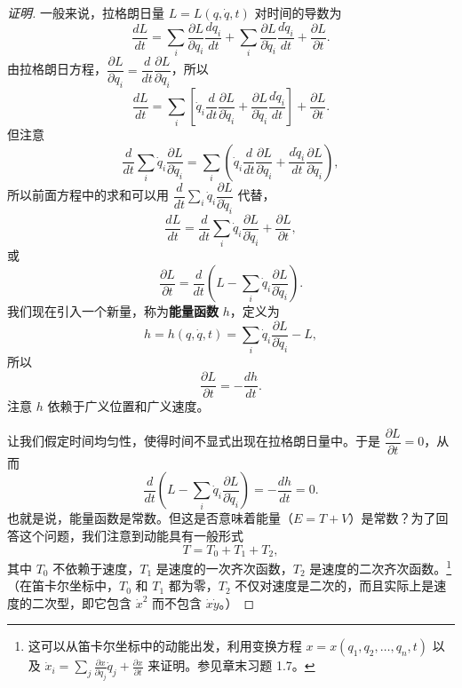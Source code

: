 \begin{proof}[证明]
一般来说，拉格朗日量 $L = L(q, \dot{q}, t)$ 对时间的导数为
\begin{equation}\label{eq:1.dLdt}
\frac{dL}{dt} = \sum_i\frac{\partial L}{\partial q_i}\frac{dq_i}{dt} + \sum_i\frac{\partial L}{\partial \dot{q}_i}\frac{d\dot{q}_i}{dt} + \frac{\partial L}{\partial t}.
\end{equation}
由拉格朗日方程，$\dfrac{\partial L}{\partial q_i} = \dfrac{d}{dt}\dfrac{\partial L}{\partial \dot{q}_i}$，所以
\begin{equation}\label{eq:1.dLdt2}
\frac{dL}{dt} = \sum_i\left[\dot{q}_i\frac{d}{dt}\frac{\partial L}{\partial \dot{q}_i} + \frac{\partial L}{\partial \dot{q}_i}\frac{d\dot{q}_i}{dt}\right] + \frac{\partial L}{\partial t}.
\end{equation}
但注意
\begin{equation}\label{eq:1.dsum}
\frac{d}{dt}\sum_i\dot{q}_i\frac{\partial L}{\partial \dot{q}_i} = \sum_i\left(\dot{q}_i\frac{d}{dt}\frac{\partial L}{\partial \dot{q}_i} + \frac{d\dot{q}_i}{dt}\frac{\partial L}{\partial \dot{q}_i}\right),
\end{equation}
所以前面方程中的求和可以用 $\dfrac{d}{dt}\sum_i\dot{q}_i\dfrac{\partial L}{\partial \dot{q}_i}$ 代替，
\begin{equation}\label{eq:1.dLdt3}
\frac{dL}{dt} = \frac{d}{dt}\sum_i\dot{q}_i\frac{\partial L}{\partial \dot{q}_i} + \frac{\partial L}{\partial t},
\end{equation}
或
\begin{equation}\label{eq:1.dLdt4}
\frac{\partial L}{\partial t} = \frac{d}{dt}\left(L - \sum_i\dot{q}_i\frac{\partial L}{\partial \dot{q}_i}\right).
\end{equation}
我们现在引入一个新量，称为\textbf{能量函数} $h$，定义为
\begin{equation}\label{eq:1.h}
h = h(q, \dot{q}, t) = \sum_i\dot{q}_i\frac{\partial L}{\partial \dot{q}_i} - L,
\end{equation}
所以
\begin{equation}\label{eq:1.dh}
\frac{\partial L}{\partial t} = -\frac{dh}{dt}.
\end{equation}
注意 $h$ 依赖于广义位置和广义速度。

让我们假定时间均匀性，使得时间不显式出现在拉格朗日量中。于是 $\dfrac{\partial L}{\partial t} = 0$，从而
\begin{equation}\label{eq:1.hcons}
\frac{d}{dt}\left(L - \sum_i\dot{q}_i\frac{\partial L}{\partial \dot{q}_i}\right) = -\frac{dh}{dt} = 0.
\end{equation}
也就是说，能量函数是常数。但这是否意味着能量（$E = T + V$）是常数？为了回答这个问题，我们注意到动能具有一般形式
\begin{equation}\label{eq:1.TTT}
T = T_0 + T_1 + T_2,
\end{equation}
其中 $T_0$ 不依赖于速度，$T_1$ 是速度的一次齐次函数，$T_2$ 是速度的二次齐次函数。\footnote{这可以从笛卡尔坐标中的动能出发，利用变换方程 $x = x(q_1, q_2, \ldots, q_n, t)$ 以及 $\dot{x}_i = \sum_j\frac{\partial x}{\partial q_j}\dot{q}_j + \frac{\partial x}{\partial t}$ 来证明。参见章末习题 1.7。}（在笛卡尔坐标中，$T_0$ 和 $T_1$ 都为零，$T_2$ 不仅对速度是二次的，而且实际上是速度的二次型，即它包含 $\dot{x}^2$ 而不包含 $\dot{x}\dot{y}$。）


\end{proof}
